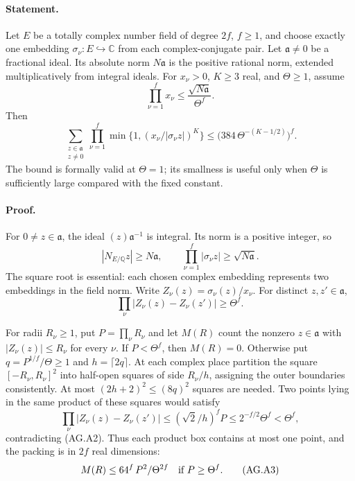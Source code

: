 \documentclass[11pt,a4paper]{article}
\numberwithin{equation}{section}
\theoremstyle{remark}\newtheorem{remark}[theorem]{Remark}
\begin{document}
\paragraph{Statement.}
Let \(E\) be a totally complex number field of degree \(2f\),
\(f\ge1\), and choose exactly one embedding
\(\sigma_\nu:E\hookrightarrow\mathbb C\) from each complex-conjugate
pair.  Let \(\mathfrak a\ne0\) be a fractional ideal.  Its absolute
norm \(N\mathfrak a\) is the positive rational norm, extended
multiplicatively from integral ideals.  For \(x_\nu>0\), \(K\ge3\)
real, and \(\Theta\ge1\), assume
\[
 \prod_{\nu=1}^{f}x_\nu\le
        \frac{\sqrt{N\mathfrak a}}{\Theta^f}.
\]
Then
\[
 \sum_{\substack{z\in\mathfrak a\\z\ne0}}
 \prod_{\nu=1}^{f}
       \min\{1,(x_\nu/|\sigma_\nu z|)^K\}
 \le \bigl(384\,\Theta^{-(K-1/2)}\bigr)^f.                 \tag{AG.A1}
\]
The bound is formally valid at \(\Theta=1\); its smallness is
useful only when \(\Theta\) is sufficiently large compared with
the fixed constant.

\paragraph{Proof.}
For \(0\ne z\in\mathfrak a\), the ideal
\((z)\mathfrak a^{-1}\) is integral.  Its norm is a positive
integer, so
\[
 |N_{E/\mathbb Q}z|\ge N\mathfrak a,\qquad
 \prod_{\nu=1}^{f}|\sigma_\nu z|\ge\sqrt{N\mathfrak a}.
\]
The square root is essential: each chosen complex embedding
represents two embeddings in the field norm.
Write \(Z_\nu(z)=\sigma_\nu(z)/x_\nu\).
For distinct \(z,z'\in\mathfrak a\),
\[
 \prod_\nu|Z_\nu(z)-Z_\nu(z')|\ge\Theta^f.                 \tag{AG.A2}
\]

For radii \(R_\nu\ge1\), put \(P=\prod_\nu R_\nu\) and let
\(M(R)\) count the nonzero \(z\in\mathfrak a\) with
\(|Z_\nu(z)|\le R_\nu\) for every \(\nu\).
If \(P<\Theta^f\), then \(M(R)=0\).
Otherwise put \(q=P^{1/f}/\Theta\ge1\) and
\(h=\lceil2q\rceil\).
At each complex place partition the square
\([-R_\nu,R_\nu]^2\) into half-open squares of side \(R_\nu/h\),
assigning the outer boundaries consistently.
At most \((2h+2)^2\le(8q)^2\) squares are needed.
Two points lying in the same product of these squares would
satisfy
\[
 \prod_\nu|Z_\nu(z)-Z_\nu(z')|
 \le(\sqrt2/h)^fP
 \le 2^{-f/2}\Theta^f<\Theta^f,
\]
contradicting (AG.A2).  Thus each product box contains at most
one point, and the packing is in \(2f\) real dimensions:
\[
 M(R)\le64^f\,P^2/\Theta^{2f}
       \quad\hbox{if }P\ge\Theta^f.                        \tag{AG.A3}
\]
\end{document}
